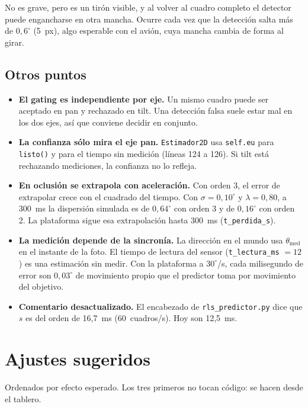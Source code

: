 \documentclass[11pt,a4paper]{article}
\newcommand{\cod}[1]{\texttt{#1}}
\newcommand{\lam}{\lambda}
\newcommand{\gr}{^{\circ}}
\begin{document}
No es grave, pero es un tirón visible, y al volver al cuadro completo el detector puede engancharse en otra
mancha. Ocurre cada vez que la detección salta más de $0{,}6\gr$ (5~px), algo esperable con el avión, cuya
mancha cambia de forma al girar.

\subsection{Otros puntos}

\begin{itemize}
  \item \textbf{El gating es independiente por eje.} Un mismo cuadro puede ser aceptado en pan y rechazado en
        tilt. Una detección falsa suele estar mal en los dos ejes, así que conviene decidir en conjunto.
  \item \textbf{La confianza sólo mira el eje pan.} \cod{Estimador2D} usa \cod{self.eu} para \cod{listo()} y para
        el tiempo sin medición (líneas 124 a 126). Si tilt está rechazando mediciones, la confianza no lo refleja.
  \item \textbf{En oclusión se extrapola con aceleración.} Con orden 3, el error de extrapolar crece con el
        cuadrado del tiempo. Con $\sigma = 0{,}10\gr$ y $\lam = 0{,}80$, a 300~ms la dispersión simulada es de
        $0{,}64\gr$ con orden 3 y de $0{,}16\gr$ con orden 2. La plataforma sigue esa extrapolación hasta
        300~ms (\cod{t\_perdida\_s}).
  \item \textbf{La medición depende de la sincronía.} La dirección en el mundo usa $\theta_{\mathrm{med}}$ en el
        instante de la foto. El tiempo de lectura del sensor (\cod{t\_lectura\_ms} $= 12$) es una estimación sin
        medir. Con la plataforma a $30\gr$/s, cada milisegundo de error son $0{,}03\gr$ de movimiento propio que
        el predictor toma por movimiento del objetivo.
  \item \textbf{Comentario desactualizado.} El encabezado de \cod{rls\_predictor.py} dice que $s$ es del orden de
        16,7~ms (60~cuadros/s). Hoy son 12,5~ms.
\end{itemize}

\newpage
\section{Ajustes sugeridos}
\label{sec:ajustes}

Ordenados por efecto esperado. Los tres primeros no tocan código: se hacen desde el tablero.
\end{document}
